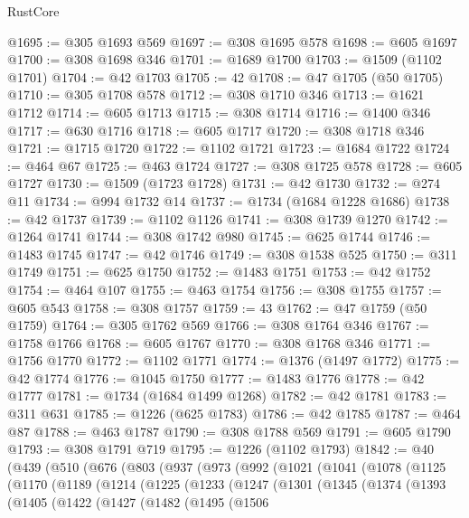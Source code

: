 \begin{lexlean}{RustCore}
\begin{coremodule}
@1695 := @305 @1693 @569
@1697 := @308 @1695 @578
@1698 := @605 @1697
@1700 := @308 @1698 @346
@1701 := @1689 @1700
@1703 := @1509 (@1102 @1701)
@1704 := @42 @1703
@1705 := 42
@1708 := @47 @1705 (@50 @1705)
@1710 := @305 @1708 @578
@1712 := @308 @1710 @346
@1713 := @1621 @1712
@1714 := @605 @1713
@1715 := @308 @1714
@1716 := @1400 @346
@1717 := @630 @1716
@1718 := @605 @1717
@1720 := @308 @1718 @346
@1721 := @1715 @1720
@1722 := @1102 @1721
@1723 := @1684 @1722
@1724 := @464 @67
@1725 := @463 @1724
@1727 := @308 @1725 @578
@1728 := @605 @1727
@1730 := @1509 (@1723 @1728)
@1731 := @42 @1730
@1732 := @274 @11
@1734 := @994 @1732 @14
@1737 := @1734 (@1684 @1228 @1686)
@1738 := @42 @1737
@1739 := @1102 @1126
@1741 := @308 @1739 @1270
@1742 := @1264 @1741
@1744 := @308 @1742 @980
@1745 := @625 @1744
@1746 := @1483 @1745
@1747 := @42 @1746
@1749 := @308 @1538 @525
@1750 := @311 @1749
@1751 := @625 @1750
@1752 := @1483 @1751
@1753 := @42 @1752
@1754 := @464 @107
@1755 := @463 @1754
@1756 := @308 @1755
@1757 := @605 @543
@1758 := @308 @1757
@1759 := 43
@1762 := @47 @1759 (@50 @1759)
@1764 := @305 @1762 @569
@1766 := @308 @1764 @346
@1767 := @1758 @1766
@1768 := @605 @1767
@1770 := @308 @1768 @346
@1771 := @1756 @1770
@1772 := @1102 @1771
@1774 := @1376 (@1497 @1772)
@1775 := @42 @1774
@1776 := @1045 @1750
@1777 := @1483 @1776
@1778 := @42 @1777
@1781 := @1734 (@1684 @1499 @1268)
@1782 := @42 @1781
@1783 := @311 @631
@1785 := @1226 (@625 @1783)
@1786 := @42 @1785
@1787 := @464 @87
@1788 := @463 @1787
@1790 := @308 @1788 @569
@1791 := @605 @1790
@1793 := @308 @1791 @719
@1795 := @1226 (@1102 @1793)
@1842 := @40
    (@439
      (@510
        (@676
          (@803
            (@937
              (@973
                (@992
                  (@1021
                    (@1041
                      (@1078
                        (@1125
                          (@1170
                            (@1189
                              (@1214
                                (@1225
                                  (@1233
                                    (@1247
                                      (@1301
                                        (@1345
                                          (@1374
                                            (@1393
                                              (@1405
                                                (@1422
                                                  (@1427
                                                    (@1482
                                                      (@1495
                                                        (@1506

\end{coremodule}
\end{lexlean}
